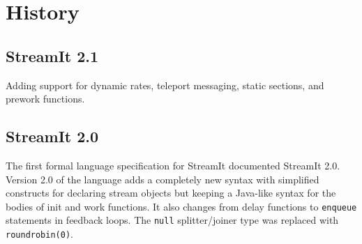 \documentclass[11pt]{article}
\begin{document}

%



  


\section{History}

\subsection{StreamIt 2.1}

Adding support for dynamic rates, teleport messaging, static sections,
and prework functions.

\subsection{StreamIt 2.0}

The first formal language specification for StreamIt documented
StreamIt 2.0.  Version 2.0 of the language adds a completely new
syntax with simplified constructs for declaring stream objects but
keeping a Java-like syntax for the bodies of init and work functions.
It also changes
from delay functions to \lstinline|enqueue| statements in feedback
loops.  The \lstinline|null| splitter/joiner type was replaced with
\lstinline|roundrobin(0)|.
\end{document}
